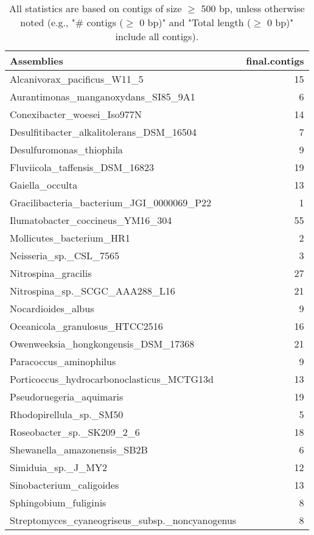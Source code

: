 \documentclass[12pt,a4paper]{article}
\begin{document}
\begin{table}[ht]
\begin{center}
\caption{All statistics are based on contigs of size $\geq$ 500 bp, unless otherwise noted (e.g., "\# contigs ($\geq$ 0 bp)" and "Total length ($\geq$ 0 bp)" include all contigs).}
\begin{tabular}{|l*{1}{|r}|}
\hline
Assemblies & final.contigs \\ \hline
Alcanivorax\_pacificus\_W11\_5 & 15 \\ \hline
Aurantimonas\_manganoxydans\_SI85\_9A1 & 6 \\ \hline
Conexibacter\_woesei\_Iso977N & 14 \\ \hline
Desulfitibacter\_alkalitolerans\_DSM\_16504 & 7 \\ \hline
Desulfuromonas\_thiophila & 9 \\ \hline
Fluviicola\_taffensis\_DSM\_16823 & 19 \\ \hline
Gaiella\_occulta & 13 \\ \hline
Gracilibacteria\_bacterium\_JGI\_0000069\_P22 & 1 \\ \hline
Ilumatobacter\_coccineus\_YM16\_304 & 55 \\ \hline
Mollicutes\_bacterium\_HR1 & 2 \\ \hline
Neisseria\_sp.\_CSL\_7565 & 3 \\ \hline
Nitrospina\_gracilis & 27 \\ \hline
Nitrospina\_sp.\_SCGC\_AAA288\_L16 & 21 \\ \hline
Nocardioides\_albus & 9 \\ \hline
Oceanicola\_granulosus\_HTCC2516 & 16 \\ \hline
Owenweeksia\_hongkongensis\_DSM\_17368 & 21 \\ \hline
Paracoccus\_aminophilus & 9 \\ \hline
Porticoccus\_hydrocarbonoclasticus\_MCTG13d & 13 \\ \hline
Pseudoruegeria\_aquimaris & 19 \\ \hline
Rhodopirellula\_sp.\_SM50 & 5 \\ \hline
Roseobacter\_sp.\_SK209\_2\_6 & 18 \\ \hline
Shewanella\_amazonensis\_SB2B & 6 \\ \hline
Simiduia\_sp.\_J\_MY2 & 12 \\ \hline
Sinobacterium\_caligoides & 13 \\ \hline
Sphingobium\_fuliginis & 8 \\ \hline
Streptomyces\_cyaneogriseus\_subsp.\_noncyanogenus & 8 \\ \hline

\end{tabular}
\end{center}
\end{table}
\end{document}
